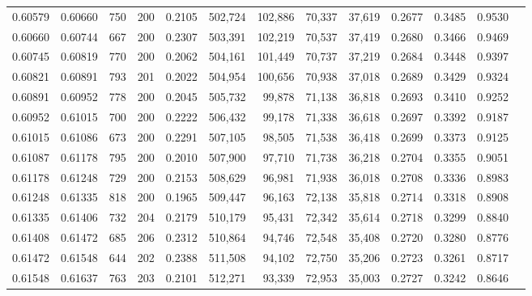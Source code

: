 \begin{tabular}{rrrrrrrrrrrrr}
0.60579 & 0.60660 &   750 & 200 &                                     0.2105 & 502,724 & 102,886 &  70,337 &  37,619 & 0.2677 & 0.3485 & 0.9530 \\
0.60660 & 0.60744 &   667 & 200 &                                     0.2307 & 503,391 & 102,219 &  70,537 &  37,419 & 0.2680 & 0.3466 & 0.9469 \\
0.60745 & 0.60819 &   770 & 200 &                                     0.2062 & 504,161 & 101,449 &  70,737 &  37,219 & 0.2684 & 0.3448 & 0.9397 \\
0.60821 & 0.60891 &   793 & 201 &                                     0.2022 & 504,954 & 100,656 &  70,938 &  37,018 & 0.2689 & 0.3429 & 0.9324 \\
0.60891 & 0.60952 &   778 & 200 &                                     0.2045 & 505,732 &  99,878 &  71,138 &  36,818 & 0.2693 & 0.3410 & 0.9252 \\
0.60952 & 0.61015 &   700 & 200 &                                     0.2222 & 506,432 &  99,178 &  71,338 &  36,618 & 0.2697 & 0.3392 & 0.9187 \\
0.61015 & 0.61086 &   673 & 200 &                                     0.2291 & 507,105 &  98,505 &  71,538 &  36,418 & 0.2699 & 0.3373 & 0.9125 \\
0.61087 & 0.61178 &   795 & 200 &                                     0.2010 & 507,900 &  97,710 &  71,738 &  36,218 & 0.2704 & 0.3355 & 0.9051 \\
0.61178 & 0.61248 &   729 & 200 &                                     0.2153 & 508,629 &  96,981 &  71,938 &  36,018 & 0.2708 & 0.3336 & 0.8983 \\
0.61248 & 0.61335 &   818 & 200 &                                     0.1965 & 509,447 &  96,163 &  72,138 &  35,818 & 0.2714 & 0.3318 & 0.8908 \\
0.61335 & 0.61406 &   732 & 204 &                                     0.2179 & 510,179 &  95,431 &  72,342 &  35,614 & 0.2718 & 0.3299 & 0.8840 \\
0.61408 & 0.61472 &   685 & 206 &                                     0.2312 & 510,864 &  94,746 &  72,548 &  35,408 & 0.2720 & 0.3280 & 0.8776 \\
0.61472 & 0.61548 &   644 & 202 &                                     0.2388 & 511,508 &  94,102 &  72,750 &  35,206 & 0.2723 & 0.3261 & 0.8717 \\
0.61548 & 0.61637 &   763 & 203 &                                     0.2101 & 512,271 &  93,339 &  72,953 &  35,003 & 0.2727 & 0.3242 & 0.8646 \\

\end{tabular}
